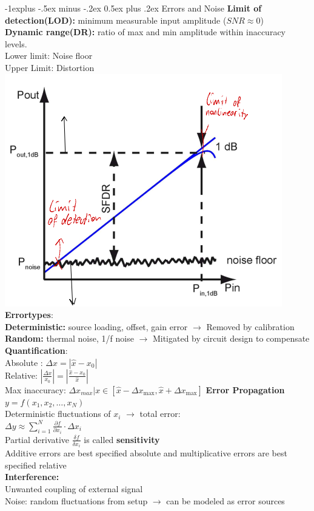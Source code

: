 \documentclass[5pt,landscape]{article}
\makeatletter
\renewcommand{\subsection}{\@startsection{subsection}{2}{0mm}%
                                {-1explus -.5ex minus -.2ex}%
                                {0.5ex plus .2ex}%
                                {\normalfont\normalsize\bfseries}}
\makeatother
\begin{document}
\begin{multicols*}{5}
 \subsection{Errors and Noise}
 \textbf{Limit of detection(LOD):} minimum measurable input amplitude ($ SNR \approx 0 $)  \\
 \textbf{Dynamic range(DR):} ratio of max and min amplitude within inaccuracy levels.\\
 Lower limit: Noise floor\\
 Upper Limit: Distortion
 \includegraphics[width = \columnwidth]{images/lod_dr.png}\\
 \textbf{Errortypes}:\\
\textbf{ Deterministic:} source loading, offset, gain error $ \rightarrow $
Removed by calibration\\
\textbf{ Random:} thermal noise, 1/f noise $ \rightarrow $
Mitigated by circuit design to compensate\\
 \textbf{Quantification}:\\
 Absolute : $ \Delta x=\left|\hat{x}-x_{0}\right| $\\
Relative: $\left|\frac{\Delta x}{x_{0}}\right|=\left|\frac{\hat{x}-x_{0}}{\hat{x}}\right|  $\\
Max inaccuracy: $ \Delta x_{max}| x \in \left[\hat{x}-\Delta x_{\max }, \hat{x}+\Delta x_{\max }\right] $
\textbf{Error Propagation}\\
$ y=f\left(x_{1}, x_{2}, \ldots, x_{N}\right) $\\
Deterministic fluctuations of $ x_i $ $ \rightarrow $ total error:\\
$\Delta y \approx \sum_{i=1}^{N} \frac{\partial f}{\partial x_{i}} \cdot \Delta x_{i}  $\\
Partial derivative $ \frac{\delta f}{\delta x_i} $ is called \textbf{sensitivity}\\
Additive errors are best specified absolute and multiplicative errors are best specified relative \\
\textbf{Interference:}\\
Unwanted coupling of external signal\\
Noise: random fluctuations from setup $ \rightarrow $ can be modeled as error sources

\end{multicols*}
\end{document}
